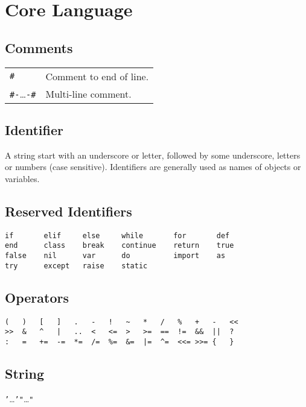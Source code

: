 \section*{Core Language}

\subsection*{Comments}
\begin{tabular}{@{}ll}
\texttt{\#} & Comment to end of line. \\
\texttt{\#-}\dots\texttt{-\#} & Multi-line comment.
\end{tabular}

\subsection*{Identifier}
A string start with an underscore or letter, followed by some underscore, letters or numbers (case sensitive). Identifiers are generally used as names of objects or variables.

\subsection*{Reserved Identifiers}
\begin{lstlisting}[numbers=none]
if       elif     else     while       for       def
end      class    break    continue    return    true
false    nil      var      do          import    as
try      except   raise    static
\end{lstlisting}

\subsection*{Operators}
\begin{lstlisting}[numbers=none]
(   )   [   ]   .   -   !   ~   *   /   %   +   -   <<  
>>  &   ^   |   ..  <   <=  >   >=  ==  !=  &&  ||  ?
:   =   +=  -=  *=  /=  %=  &=  |=  ^=  <<= >>= {   }
\end{lstlisting}

\subsection*{String}
\texttt{'}\dots\texttt{'}\quad\texttt{"}\dots\texttt{"}

